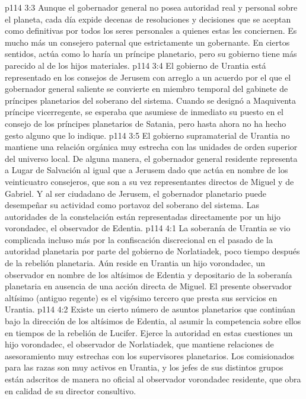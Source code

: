 \vs p114 3:3 Aunque el gobernador general no posea autoridad real y personal sobre el planeta, cada día expide decenas de resoluciones y decisiones que se aceptan como definitivas por todos los seres personales a quienes estas les conciernen. Es mucho más un consejero paternal que estrictamente un gobernante. En ciertos sentidos, actúa como lo haría un príncipe planetario, pero su gobierno tiene más parecido al de los hijos materiales.
\vs p114 3:4 \pc El gobierno de Urantia está representado en los consejos de Jerusem con arreglo a un acuerdo por el que el gobernador general saliente se convierte en miembro temporal del gabinete de príncipes planetarios del soberano del sistema. Cuando se designó a Maquiventa príncipe vicerregente, se esperaba que asumiese de inmediato su puesto en el consejo de los príncipes planetarios de Satania, pero hasta ahora no ha hecho gesto alguno que lo indique.
\vs p114 3:5 El gobierno supramaterial de Urantia no mantiene una relación orgánica muy estrecha con las unidades de orden superior del universo local. De alguna manera, el gobernador general residente representa a Lugar de Salvación al igual que a Jerusem dado que actúa en nombre de los veinticuatro consejeros, que son a su vez representantes directos de Miguel y de Gabriel. Y al ser ciudadano de Jerusem, el gobernador planetario puede desempeñar su actividad como portavoz del soberano del sistema. Las autoridades de la constelación están representadas directamente por un hijo vorondadec, el observador de Edentia.
\vs p114 4:1 La soberanía de Urantia se vio complicada incluso más por la confiscación discrecional en el pasado de la autoridad planetaria por parte del gobierno de Norlatiadek, poco tiempo después de la rebelión planetaria. Aún reside en Urantia un hijo vorondadec, un observador en nombre de los altísimos de Edentia y depositario de la soberanía planetaria en ausencia de una acción directa de Miguel. El presente observador altísimo (antiguo regente) es el vigésimo tercero que presta sus servicios en Urantia.
\vs p114 4:2 Existe un cierto número de asuntos planetarios que continúan bajo la dirección de los altísimos de Edentia, al asumir la competencia sobre ellos en tiempos de la rebelión de Lucifer. Ejerce la autoridad en estas cuestiones un hijo vorondadec, el observador de Norlatiadek, que mantiene relaciones de asesoramiento muy estrechas con los supervisores planetarios. Los comisionados para las razas son muy activos en Urantia, y los jefes de sus distintos grupos están adscritos de manera no oficial al observador vorondadec residente, que obra en calidad de su director consultivo.
